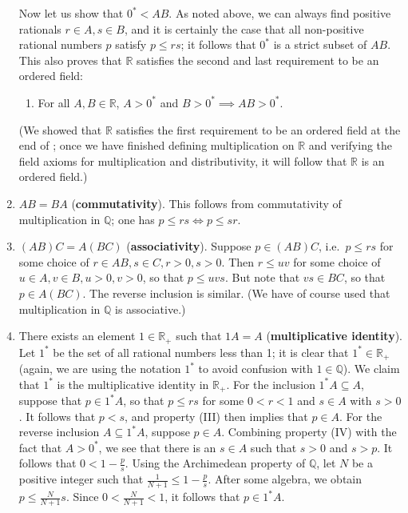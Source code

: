 \documentclass[12pt]{article}
\theoremstyle{definition}
\begin{document}
\begin{enumerate}[label = (M\arabic*)]
    Now let us show that \( 0^* < AB \). As noted above, we can always find positive rationals \( r \in A, s \in B \), and it is certainly the case that all non-positive rational numbers \( p \) satisfy \( p \leq rs \); it follows that \( 0^* \) is a strict subset of \( AB \). This also proves that \( \mathbb{R} \) satisfies the second and last requirement to be an ordered field:
    
    \begin{enumerate}[label = (OF\arabic*), left = 6px, start = 2]
        \item For all \( A, B \in \mathbb{R} \), \( A > 0^* \) and \( B > 0 ^* \implies AB > 0^* \).
    \end{enumerate}
    
    (We showed that \( \mathbb{R} \) satisfies the first requirement to be an ordered field at the end of ; once we have finished defining multiplication on \( \mathbb{R} \) and verifying the field axioms for multiplication and distributivity, it will follow that \( \mathbb{R} \) is an ordered field.)
    
    \item \( AB = BA \) (\textbf{commutativity}). This follows from commutativity of multiplication in \( \mathbb{Q} \); one has \( p \leq rs \iff p \leq sr \).
    
    \item \( (AB)C = A(BC) \) (\textbf{associativity}). Suppose \( p \in (AB)C \), i.e.\ \( p \leq rs \) for some choice of \( r \in AB, s \in C, r > 0, s > 0 \). Then \( r \leq uv \) for some choice of \( u \in A, v \in B, u > 0, v > 0 \), so that \( p \leq uvs \). But note that \( vs \in BC \), so that \( p \in A(BC) \). The reverse inclusion is similar. (We have of course used that multiplication in \( \mathbb{Q} \) is associative.)
    
    \item There exists an element \( 1 \in \mathbb{R}_+ \) such that \( 1A = A \) (\textbf{multiplicative identity}). Let \( 1^* \) be the set of all rational numbers less than 1; it is clear that \( 1^* \in \mathbb{R}_+ \) (again, we are using the notation \( 1^* \) to avoid confusion with \( 1 \in \mathbb{Q} \)). We claim that \( 1^* \) is the multiplicative identity in \( \mathbb{R}_+ \). For the inclusion \( 1^* A \subseteq A \), suppose that \( p \in 1^* A \), so that \( p \leq rs \) for some \( 0 < r < 1 \) and \( s \in A \) with \( s > 0 \). It follows that \( p < s \), and property (III) then implies that \( p \in A \). For the reverse inclusion \( A \subseteq 1^* A \), suppose \( p \in A \). Combining property (IV) with the fact that \( A > 0^* \), we see that there is an \( s \in A \) such that \( s > 0 \) and \( s > p \). It follows that \( 0 < 1 - \frac{p}{s} \). Using the Archimedean property of \( \mathbb{Q} \), let \( N \) be a positive integer such that \( \frac{1}{N+1} \leq 1 - \frac{p}{s} \). After some algebra, we obtain \( p \leq \frac{N}{N+1} s \). Since \( 0 < \frac{N}{N+1} < 1 \), it follows that \( p \in 1^* A \).
    

\end{enumerate}
\end{document}
